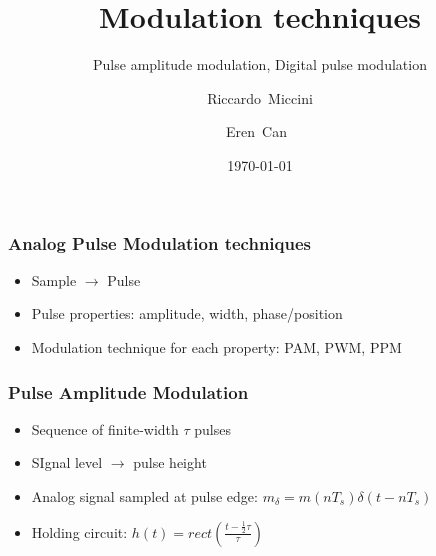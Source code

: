 \documentclass{beamer}
\title{Modulation techniques}
\subtitle{Pulse amplitude modulation, Digital pulse modulation}
\author[Riccardo \and Eren]{Riccardo~Miccini\inst{1} \and Eren~Can~\inst{1}}
\institute[DTU]
{
	\inst{1}
	Technical University of Denmark\\
	Digital Communication
}
\date{\today}
\begin{document}
	\frame{\titlepage}

	\begin{frame}
		\frametitle{Analog Pulse Modulation techniques}
		\begin{itemize}
			\item Sample $ \rightarrow $ Pulse
			\item Pulse properties: amplitude, width, phase/position
			\item Modulation technique for each property: PAM, PWM, PPM
		\end{itemize}
	\end{frame}

	\begin{frame}
		\frametitle{Pulse Amplitude Modulation}
		\begin{itemize}
			\item Sequence of finite-width $ \tau $ pulses
			\item SIgnal level $ \rightarrow $ pulse height 
			\item Analog signal sampled at pulse edge: $ m_\delta = m(nT_s)\delta(t - nT_s) $
			\item Holding circuit: $ h(t) = rect(\frac{t - \frac{1}{2}\tau}{\tau}) $
		\end{itemize}
	\end{frame}
\end{document}
